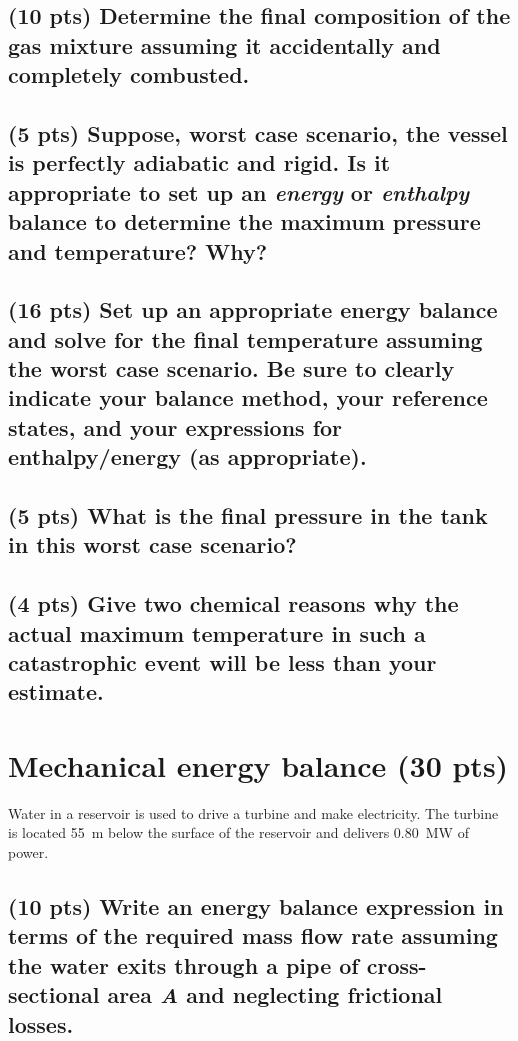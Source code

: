 \documentclass[11pt]{article}
\begin{document}
\subsection{(10 pts) Determine the final composition of the gas mixture assuming it accidentally and completely combusted.}
\label{sec-2-3}
\vspace{10cm}

\subsection{(5 pts) Suppose, worst case scenario, the vessel is perfectly adiabatic and rigid.  Is it appropriate to set up an \emph{energy} or \emph{enthalpy} balance to determine the maximum pressure and temperature?  Why?}
\label{sec-2-4}
\newpage

\subsection{(16 pts) Set up an appropriate energy balance and solve for the final temperature assuming the worst case scenario.  Be sure to clearly indicate your balance method, your reference states, and your expressions for enthalpy/energy (as appropriate).}
\label{sec-2-5}
\newpage



\subsection{(5 pts) What is the final pressure in the tank in this worst case scenario?}
\label{sec-2-6}
\vspace{10cm}

\subsection{(4 pts) Give two chemical reasons why the actual maximum temperature in such a catastrophic event will be less than your estimate.}
\label{sec-2-7}
\newpage


\section{Mechanical energy balance (30 pts)}
\label{sec-3}
Water in a reservoir is used to drive a turbine and make electricity.  The turbine is located \SI{55}{\meter} below the surface of the reservoir and delivers \SI{0.80}{\mega\watt} of power.

\subsection{(10 pts) Write an energy balance expression in terms of the required mass flow rate assuming the water exits through a pipe of cross-sectional area \emph{A} and neglecting frictional losses.}
\label{sec-3-1}
\vspace{5cm}
\end{document}

